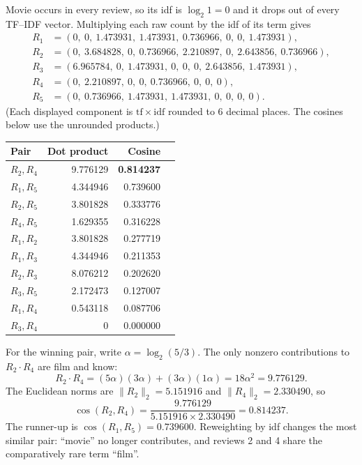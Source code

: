 \documentclass[11pt]{article}
\begin{document}
\noindent Movie occurs in every review, so its idf is $\log_2 1=0$ and it drops out of every TF--IDF vector. Multiplying each raw count by the idf of its term gives
\begin{align*}
R_1 &= (0,\ 0,\ 1.473931,\ 1.473931,\ 0.736966,\ 0,\ 0,\ 1.473931),\\
R_2 &= (0,\ 3.684828,\ 0,\ 0.736966,\ 2.210897,\ 0,\ 2.643856,\ 0.736966),\\
R_3 &= (6.965784,\ 0,\ 1.473931,\ 0,\ 0,\ 0,\ 2.643856,\ 1.473931),\\
R_4 &= (0,\ 2.210897,\ 0,\ 0,\ 0.736966,\ 0,\ 0,\ 0),\\
R_5 &= (0,\ 0.736966,\ 1.473931,\ 1.473931,\ 0,\ 0,\ 0,\ 0).
\end{align*}
(Each displayed component is $\mathrm{tf}\times\mathrm{idf}$ rounded to 6 decimal places. The cosines below use the unrounded products.)

\begin{center}
\small
\begin{tabular}{lrrr}
\toprule
Pair & Dot product & Cosine \\
\midrule
$R_2,R_4$ & 9.776129 & \textbf{0.814237} \\
$R_1,R_5$ & 4.344946 & 0.739600 \\
$R_2,R_5$ & 3.801828 & 0.333776 \\
$R_4,R_5$ & 1.629355 & 0.316228 \\
$R_1,R_2$ & 3.801828 & 0.277719 \\
$R_1,R_3$ & 4.344946 & 0.211353 \\
$R_2,R_3$ & 8.076212 & 0.202620 \\
$R_3,R_5$ & 2.172473 & 0.127007 \\
$R_1,R_4$ & 0.543118 & 0.087706 \\
$R_3,R_4$ & 0 & 0.000000 \\
\bottomrule
\end{tabular}
\end{center}

For the winning pair, write $\alpha=\log_2(5/3)$. The only nonzero contributions to $R_2\cdot R_4$ are film and know:
\[
R_2\cdot R_4 = (5\alpha)(3\alpha) + (3\alpha)(1\alpha) = 18\alpha^2 = 9.776129.
\]
The Euclidean norms are $\|R_2\|_2=5.151916$ and $\|R_4\|_2=2.330490$, so
\[
\cos(R_2,R_4)=\frac{9.776129}{5.151916\times 2.330490}=0.814237.
\]
The runner-up is $\cos(R_1,R_5)=0.739600$. Reweighting by idf changes the most similar pair: ``movie'' no longer contributes, and reviews 2 and 4 share the comparatively rare term ``film''.
\end{document}
